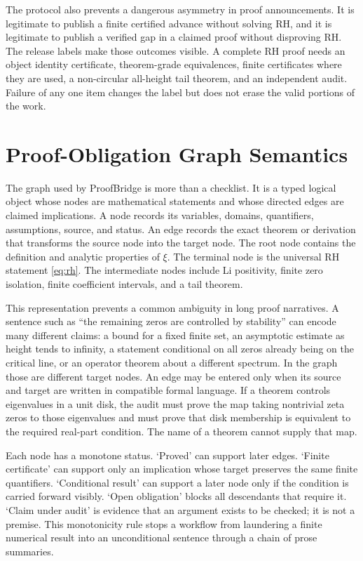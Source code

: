 \documentclass[conference]{../../../../Conference-LaTeX-template_10-17-19/IEEEtran}
\begin{document}
The protocol also prevents a dangerous asymmetry in proof announcements. It is legitimate to publish a finite certified advance without solving RH, and it is legitimate to publish a verified gap in a claimed proof without disproving RH. The release labels make those outcomes visible. A complete RH proof needs an object identity certificate, theorem-grade equivalences, finite certificates where they are used, a non-circular all-height tail theorem, and an independent audit. Failure of any one item changes the label but does not erase the valid portions of the work.
\balance
\section{Proof-Obligation Graph Semantics}
The graph used by ProofBridge is more than a checklist. It is a typed logical object whose nodes are mathematical statements and whose directed edges are claimed implications. A node records its variables, domains, quantifiers, assumptions, source, and status. An edge records the exact theorem or derivation that transforms the source node into the target node. The root node contains the definition and analytic properties of $\xi$. The terminal node is the universal RH statement \eqref{eq:rh}. The intermediate nodes include Li positivity, finite zero isolation, finite coefficient intervals, and a tail theorem.

This representation prevents a common ambiguity in long proof narratives. A sentence such as ``the remaining zeros are controlled by stability'' can encode many different claims: a bound for a fixed finite set, an asymptotic estimate as height tends to infinity, a statement conditional on all zeros already being on the critical line, or an operator theorem about a different spectrum. In the graph those are different target nodes. An edge may be entered only when its source and target are written in compatible formal language. If a theorem controls eigenvalues in a unit disk, the audit must prove the map taking nontrivial zeta zeros to those eigenvalues and must prove that disk membership is equivalent to the required real-part condition. The name of a theorem cannot supply that map.

Each node has a monotone status. `Proved' can support later edges. `Finite certificate' can support only an implication whose target preserves the same finite quantifiers. `Conditional result' can support a later node only if the condition is carried forward visibly. `Open obligation' blocks all descendants that require it. `Claim under audit' is evidence that an argument exists to be checked; it is not a premise. This monotonicity rule stops a workflow from laundering a finite numerical result into an unconditional sentence through a chain of prose summaries.
\end{document}
